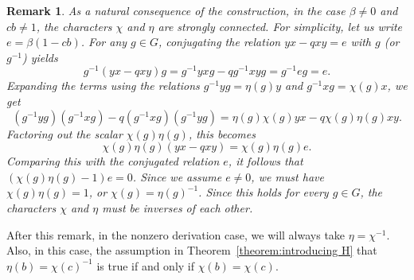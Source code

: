 \documentclass[11pt, twoside]{amsart}
\newtheorem{remark}[theorem]{Remark}
\theoremstyle{definition}
\begin{document}
%
\begin{remark}\label{remark:chi-eta-inverse}
    As a natural consequence of the construction, in the case $\beta \neq 0$ and $cb \neq 1$, the characters $\chi$ and $\eta$ are strongly connected. For simplicity, let us write $e = \beta(1 - cb)$. For any $g \in G$, conjugating the relation $yx - qxy = e$ with $g$ (or $g^{-1}$) yields
    \[g^{-1}(yx - qxy)g = g^{-1}yxg - q g^{-1}xyg = g^{-1}eg = e.\]
    Expanding the terms using the relations $g^{-1}yg = \eta(g)y$ and $g^{-1}xg = \chi(g)x$, we get
    \[ (g^{-1}yg)(g^{-1}xg) - q(g^{-1}xg)(g^{-1}yg) = \eta(g)\chi(g)yx - q\chi(g)\eta(g)xy. \]
    Factoring out the scalar $\chi(g)\eta(g)$, this becomes
    \[ \chi(g)\eta(g)(yx - qxy) = \chi(g)\eta(g)e. \]
    Comparing this with the conjugated relation $e$, it follows that $(\chi(g)\eta(g) - 1)e = 0$. Since we assume $e \neq 0$, we must have $\chi(g)\eta(g) = 1$, or $\chi(g) = \eta(g)^{-1}$. Since this holds for every $g \in G$, the characters $\chi$ and $\eta$ must be inverses of each other.
\end{remark}
%
After this remark, in the nonzero derivation case, we will always take $\eta = \chi^{-1}$. Also, in this case, the assumption in Theorem~\ref{theorem:introducing H} that $\eta(b) = \chi(c)^{-1}$ is true if and only if $\chi(b) = \chi(c)$.
\end{document}
